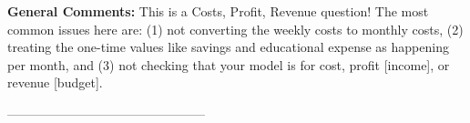 \documentclass{extbook}[14pt]
\begin{document}
\textbf{General Comments:} This is a Costs, Profit, Revenue question! The most common issues here are: (1) not converting the weekly costs to monthly costs, (2) treating the one-time values like savings and educational expense as happening per month, and (3) not checking that your model is for cost, profit [income], or revenue [budget].

-----------------------------------------------
\end{document}
